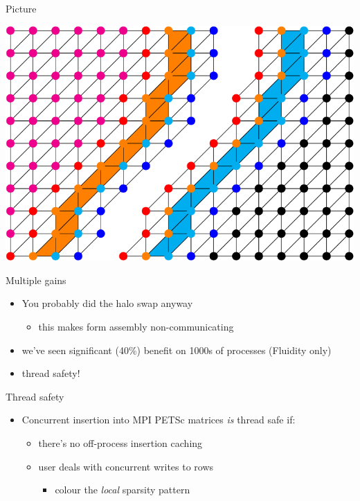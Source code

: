 \documentclass[presentation]{beamer}
\begin{document}
\begin{frame}[label={sec:orgheadline21}]{Picture}
\begin{center}
\includegraphics[width=\textwidth]{03-18-FEniCS-mesh-numbering.figures/mpi-mesh-redundant-comp}
\end{center}
\end{frame}

\begin{frame}[label={sec:orgheadline22}]{Multiple gains}
\begin{itemize}
\item You probably did the halo swap anyway
\begin{itemize}
\item this makes form assembly non-communicating
\end{itemize}
\item we've seen significant (40\%) benefit on 1000s of processes
(Fluidity only)
\item thread safety!
\end{itemize}
\end{frame}

\begin{frame}[label={sec:orgheadline23}]{Thread safety}
\begin{itemize}
\item Concurrent insertion into MPI PETSc matrices \emph{is} thread safe if:
\begin{itemize}
\item there's no off-process insertion caching
\item user deals with concurrent writes to rows
\begin{itemize}
\item colour the \emph{local} sparsity pattern
\end{itemize}
\end{itemize}
\end{itemize}
\end{frame}
\end{document}
